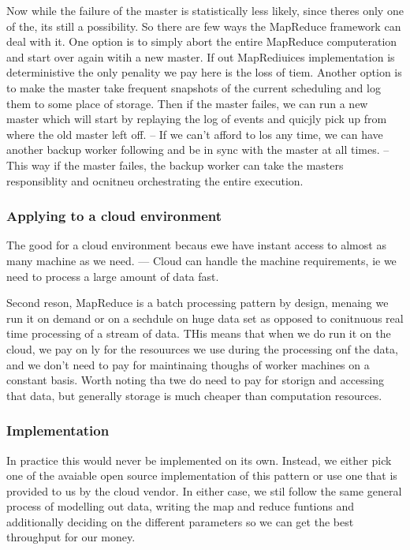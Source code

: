 \documentclass[a4paper, 11pt]{book}
\begin{document}
    Now while the failure of the master is statistically less likely, since theres only one of the, its still a possibility.
    So there are few ways the MapReduce framework can deal with it.
    One option is to simply abort the entire MapReduce computeration and start over again witih a new master.
    If out MapRediuices implementation is deterministive the only penality we pay here is the loss of tiem.
    Another option is to make the master take frequent snapshots of the current scheduling and log them to some place of storage.
    Then if the master failes, we can run a new master which will start by replaying the log of events and quicjly pick up from where the old master left off.
    -- If we can't afford to los any time, we can have another backup worker following and be in sync with the master at all times.
    -- This way if the master failes, the backup worker can take the masters responsiblity and ocnitneu orchestrating the entire execution.

    \subsubsection{Applying to a cloud environment}
    The good for a cloud environment becaus ewe have instant access to almost as many machine as we need.
    --- Cloud can handle the machine requirements, ie we need to process a large amount of data fast.

    Second reson, MapReduce is a batch processing pattern by design, menaing we run it on demand or on a sechdule on huge data set as opposed to conitnuous real time processing of a stream of data.
    THis means that when we do run it on the cloud, we pay on ly for the resouurces we use during the processing onf the data, and we don't need to pay for maintinaing thoughs of worker machines on a constant basis.
    Worth noting tha twe do need to pay for storign and accessing that data, but generally storage is much cheaper than computation resources.

    \subsubsection{Implementation}
    In practice this would never be implemented on its own.
    Instead, we either pick one of the avaiable open source implementation of this pattern or use one that is provided to us by the cloud vendor.
    In either case, we stil follow the same general process of modelling out data, writing the map and reduce funtions and additionally deciding on the different parameters so we can get the best throughput for our money.
\end{document}
